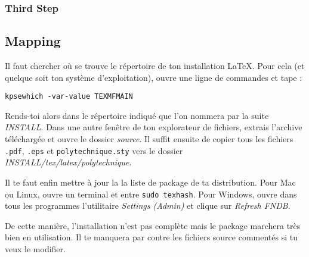 \documentclass[a4paper,12pt,twoside]{article}
\begin{document}
\subsubsection{Third Step}


\subsection{Mapping}






Il faut chercher où se trouve le répertoire de ton installation LaTeX. Pour cela (et quelque soit ton système d'exploitation), ouvre une ligne de commandes et tape :
\begin{verbatim}
kpsewhich -var-value TEXMFMAIN
\end{verbatim}
Rends-toi alors dans le répertoire indiqué que l'on nommera par la suite \emph{INSTALL}. Dans une autre fenêtre de ton explorateur de fichiers, extrais l'archive téléchargée et ouvre le dossier \emph{source}. Il suffit ensuite de copier tous les fichiers \texttt{.pdf}, \texttt{.eps} et \texttt{polytechnique.sty} vers le dossier \emph{INSTALL/tex/latex/polytechnique}. 

Il te faut enfin mettre à jour la la liste de package de ta distribution. Pour Mac ou Linux, ouvre un terminal et entre \texttt{sudo texhash}. Pour Windows, ouvre dans tous les programmes l'utilitaire \emph{Settings (Admin)} et clique sur \emph{Refresh FNDB}.

De cette manière, l'installation n'est pas complète mais le package marchera très bien en utilisation. Il te manquera par contre les fichiers source commentés si tu veux le modifier.
\end{document}
